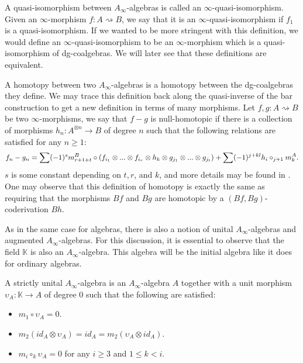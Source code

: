 \documentclass[../thesis.tex]{subfiles}
\begin{document}
        A quasi-isomorphism between $A_\infty$-algebras is called an $\infty$-quasi-isomorphism. Given an $\infty$-morphism $f: A\rightsquigarrow B$, we say that it is an $\infty$-quasi-isomorphism if $f_1$ is a quasi-isomorphism. If we wanted to be more stringent with this definition, we would define an $\infty$-quasi-isomorphism to be an $\infty$-morphism which is a quasi-isomorphism of dg-coalgebras. We will later see that these definitions are equivalent.

        A homotopy between two $A_\infty$-algebras is a homotopy between the dg-coalgebras they define. We may trace this definition back along the quasi-inverse of the bar construction to get a new definition in terms of many morphisms. Let $f,g: A\rightsquigarrow B$ be two $\infty$-morphisms, we say that $f-g$ is null-homotopic if there is a collection of morphisms $h_n : A^{\otimes n} \rightarrow B$ of degree $n$ such that the following relations are satisfied for any $n \geq 1$:
        \begin{multline*}
            f_n - g_n = \sum (-1)^s m^B_{r+1+t}\circ (f_{i_1}\otimes ... \otimes f_{i_r} \otimes h_k \otimes g_{j_1} \otimes ... \otimes g_{j_t}) +  \sum (-1)^{j+kl}h_i \circ_{j+1} m_k^A\tt{.}
        \end{multline*}
        $s$ is some constant depending on $t,r$, and $k$, and more details may be found in \cite{LefevreHasegawa03}. One may observe that this definition of homotopy is exactly the same as requiring that the morphisms $Bf$ and $Bg$ are homotopic by a $(Bf, Bg)$-coderivation $Bh$.

        As in the same case for algebras, there is also a notion of unital $A_\infty$-algebras and augmented $A_\infty$-algebras. For this discussion, it is essential to observe that the field $\mathbb{K}$ is also an $A_\infty$-algebra. This algebra will be the initial algebra like it does for ordinary algebras.

        \begin{definition}\label{def: strict-unit}
            A strictly unital $A_\infty$-algebra is an $A_\infty$-algebra $A$ together with a unit morphism $\upsilon_A : \mathbb{K} \rightarrow A$ of degree $0$ such that the following are satisfied:
            \begin{itemize}
                \item $m_1\circ \upsilon_A = 0$.
                \item $m_2(id_A \otimes \upsilon_A) = id_A = m_2(\upsilon_A\otimes id_A)$.
                \item $m_i \circ_k \upsilon_A = 0$ for any $i\geq 3$ and $1 \leq k < i$.
            \end{itemize}
        \end{definition}
\end{document}
